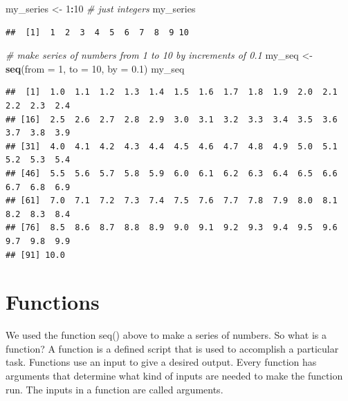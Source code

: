 \documentclass[
]{book}
\newenvironment{Shaded}{\begin{snugshade}}{\end{snugshade}}
\newcommand{\AttributeTok}[1]{\textcolor[rgb]{0.13,0.29,0.53}{#1}}
\newcommand{\CommentTok}[1]{\textcolor[rgb]{0.56,0.35,0.01}{\textit{#1}}}
\newcommand{\DecValTok}[1]{\textcolor[rgb]{0.00,0.00,0.81}{#1}}
\newcommand{\FloatTok}[1]{\textcolor[rgb]{0.00,0.00,0.81}{#1}}
\newcommand{\FunctionTok}[1]{\textcolor[rgb]{0.13,0.29,0.53}{\textbf{#1}}}
\newcommand{\NormalTok}[1]{#1}
\newcommand{\OtherTok}[1]{\textcolor[rgb]{0.56,0.35,0.01}{#1}}
\newcommand{\SpecialCharTok}[1]{\textcolor[rgb]{0.81,0.36,0.00}{\textbf{#1}}}
\begin{document}
\begin{Shaded}
\begin{Highlighting}[]
\NormalTok{my\_series }\OtherTok{\textless{}{-}} \DecValTok{1}\SpecialCharTok{:}\DecValTok{10} \CommentTok{\# just integers}
\NormalTok{my\_series}
\end{Highlighting}
\end{Shaded}

\begin{verbatim}
##  [1]  1  2  3  4  5  6  7  8  9 10
\end{verbatim}

\begin{Shaded}
\begin{Highlighting}[]
\CommentTok{\# make series of numbers from 1 to 10 by increments of 0.1}
\NormalTok{my\_seq }\OtherTok{\textless{}{-}} \FunctionTok{seq}\NormalTok{(}\AttributeTok{from =} \DecValTok{1}\NormalTok{, }\AttributeTok{to =} \DecValTok{10}\NormalTok{, }\AttributeTok{by =} \FloatTok{0.1}\NormalTok{) }
\NormalTok{my\_seq}
\end{Highlighting}
\end{Shaded}

\begin{verbatim}
##  [1]  1.0  1.1  1.2  1.3  1.4  1.5  1.6  1.7  1.8  1.9  2.0  2.1  2.2  2.3  2.4
## [16]  2.5  2.6  2.7  2.8  2.9  3.0  3.1  3.2  3.3  3.4  3.5  3.6  3.7  3.8  3.9
## [31]  4.0  4.1  4.2  4.3  4.4  4.5  4.6  4.7  4.8  4.9  5.0  5.1  5.2  5.3  5.4
## [46]  5.5  5.6  5.7  5.8  5.9  6.0  6.1  6.2  6.3  6.4  6.5  6.6  6.7  6.8  6.9
## [61]  7.0  7.1  7.2  7.3  7.4  7.5  7.6  7.7  7.8  7.9  8.0  8.1  8.2  8.3  8.4
## [76]  8.5  8.6  8.7  8.8  8.9  9.0  9.1  9.2  9.3  9.4  9.5  9.6  9.7  9.8  9.9
## [91] 10.0
\end{verbatim}

\section{Functions}\label{functions}

We used the function seq() above to make a series of numbers. So what is a function? A function is a defined script that is used to accomplish a particular task. Functions use an input to give a desired output. Every function has arguments that determine what kind of inputs are needed to make the function run. The inputs in a function are called arguments.
\end{document}

